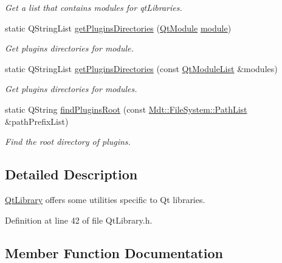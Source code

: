 \begin{DoxyCompactItemize}
\begin{DoxyCompactList}\small\item\em Get a list that contains modules for {\itshape qt\+Libraries}. \end{DoxyCompactList}\item 
static Q\+String\+List \hyperlink{class_mdt_1_1_deploy_utils_1_1_qt_library_a50c96c2d0b892da7c41d50ca627191bd}{get\+Plugins\+Directories} (\hyperlink{namespace_mdt_1_1_deploy_utils_af64a196dd2a56ed4930253e7fb4ed591}{Qt\+Module} \hyperlink{class_mdt_1_1_deploy_utils_1_1_qt_library_aa54f542e548bcab6da5e8a9696169a94}{module})
\begin{DoxyCompactList}\small\item\em Get plugins directories for {\itshape module}. \end{DoxyCompactList}\item 
static Q\+String\+List \hyperlink{class_mdt_1_1_deploy_utils_1_1_qt_library_ab555321caadc47fcb9458ba466287702}{get\+Plugins\+Directories} (const \hyperlink{class_mdt_1_1_deploy_utils_1_1_qt_module_list}{Qt\+Module\+List} \&modules)
\begin{DoxyCompactList}\small\item\em Get plugins directories for {\itshape modules}. \end{DoxyCompactList}\item 
static Q\+String \hyperlink{class_mdt_1_1_deploy_utils_1_1_qt_library_ab65467259ac3728df66c5ed369d3970c}{find\+Plugins\+Root} (const \hyperlink{class_mdt_1_1_file_system_1_1_path_list}{Mdt\+::\+File\+System\+::\+Path\+List} \&path\+Prefix\+List)
\begin{DoxyCompactList}\small\item\em Find the root directory of plugins. \end{DoxyCompactList}\end{DoxyCompactItemize}


\subsection{Detailed Description}
\hyperlink{class_mdt_1_1_deploy_utils_1_1_qt_library}{Qt\+Library} offers some utilities specific to Qt libraries. 

Definition at line 42 of file Qt\+Library.\+h.



\subsection{Member Function Documentation}
